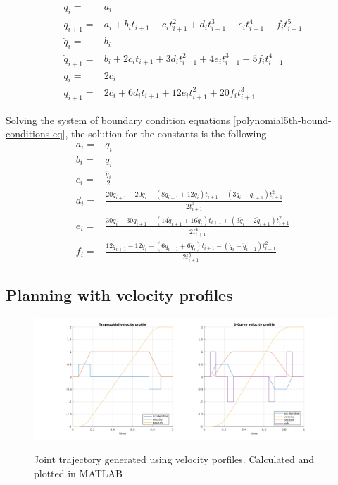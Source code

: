 \begin{equation}
\label{polynomial5th-bound-conditions-eq}
\begin{aligned}
q_i ={}& a_i \\
q_{i+1} ={}& a_i + b_it_{i+1} + c_it_{i+1}^2 + d_it_{i+1}^3 + e_it_{i+1}^4 + f_it_{i+1}^5 \\
\dot{q}_i ={}& b_i \\ 
\dot{q}_{i+1} ={}& b_i + 2c_it_{i+1} + 3d_it_{i+1}^2 + 4e_it_{i+1}^3 + 5f_it_{i+1}^4 \\
\ddot{q}_i ={}& 2c_i \\
\ddot{q}_{i+1} ={}& 2c_i + 6d_it_{i+1} + 12e_it_{i+1}^2 + 20f_it_{i+1}^3
\end{aligned}
\end{equation}

Solving the system of boundary condition equations \ref{polynomial5th-bound-conditions-eq}, the solution for the constants is the following
\begin{equation}
\begin{aligned}
a_i ={}& q_i \\
b_i ={}& \dot{q}_i \\
c_i ={}& \frac{\ddot{q}_i}{2} \\
d_i ={}& \frac{20q_{i+1} - 20q_i - (8\dot{q}_{i+1} + 12\dot{q}_i)t_{i+1} - (3\ddot{q}_i - \ddot{q}_{i+1})t_{i+1}^2 }{2t_{i+1}^3} \\
e_i ={}& \frac{30q_i - 30q_{i+1} - (14\dot{q}_{i+1} + 16\dot{q}_i)t_{i+1} + (3\ddot{q}_i - 2\ddot{q}_{i+1})t_{i+1}^2}{2t_{i+1}^4} \\
f_i ={}& \frac{12q_{i+1} - 12q_i - (6\dot{q}_{i+1} + 6\dot{q}_i)t_{i+1} - (\ddot{q}_i - \ddot{q}_{i+1})t_{i+1}^2 }{2t_{i+1}^5}
\end{aligned}
\end{equation}


\subsection{Planning with velocity profiles}

\begin{center}
\begin{figure}[!htb]
\centering
\includegraphics[width=\textwidth]{images/vel-profiles.png}\\
\caption{Joint trajectory generated using velocity porfiles. Calculated and plotted in MATLAB} 
\end{figure}
\end{center}